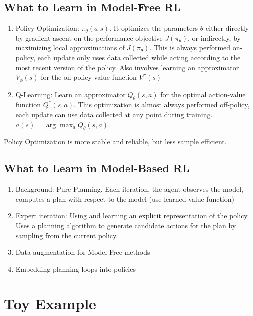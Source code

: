 \documentclass{article}
\begin{document}
  \subsection{What to Learn in Model-Free RL}
    \begin{enumerate}
      \item Policy Optimization: $\pi_\theta(a|s)$. It optimizes the parameters $\theta$ either directly by gradient ascent on the performance objective $J(\pi_{\theta})$, or indirectly, by maximizing local approximations of $J(\pi_{\theta})$. This is always performed on-policy, each update only uses data collected while acting according to the most recent version of the policy. Also involves learning an approximator $V_\phi(s)$ for the on-policy value function $V^\pi(s)$
      \item Q-Learning: Learn an approximator $Q_\theta(s, a)$ for the optimal action-value function $Q^*(s, a)$. This optimization is almost always performed off-policy, each update can use data collected at any point during training. $a(s) = \arg\max_a Q_\theta(s, a)$
    \end{enumerate}

    Policy Optimization is more stable and reliable, but less sample efficient.
  \subsection{What to Learn in Model-Based RL}
    \begin{enumerate}
      \item Background: Pure Planning. Each iteration, the agent observes the model, computes a plan with respect to the model (use learned value function)
      \item Expert iteration:  Using and learning an explicit representation of the policy. Uses a planning algorithm to generate candidate actions for the plan by sampling from the current policy.
      \item Data augmentation for Model-Free methods
      \item Embedding planning loops into policies
    \end{enumerate}

    \section{Toy Example}
\end{document}
